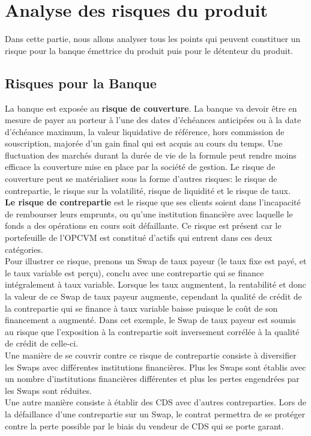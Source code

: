 \documentclass[french,12pt,a4paper]{article}
\begin{document}
\newpage
\section{Analyse des risques du produit}

Dans cette partie, nous allons analyser tous les points qui peuvent constituer un risque pour la banque émettrice du produit puis pour le détenteur du produit. \\


\subsection{Risques pour la Banque}


\indent La banque est exposée au \textbf{risque de couverture}. La banque va devoir être en mesure de payer au porteur à l'une des dates d'échéances anticipées ou à la date d'échéance maximum, la valeur liquidative de référence, hors commission de souscription, majorée d'un gain final qui est acquis au cours du temps. Une fluctuation des marchés durant la durée de vie de la formule peut rendre moins efficace la couverture mise en place par la société de gestion. Le risque de couverture peut se matérialiser sous la forme d'autres risques: le risque de contrepartie, le risque sur la volatilité, risque de liquidité et le risque de taux. \\

\indent \textbf{Le risque de contrepartie} est le risque que ses clients soient dans l'incapacité de rembourser leurs emprunts, ou qu'une institution financière avec laquelle le fonds a des opérations en cours soit défaillante. Ce risque est présent car le portefeuille de l'OPCVM est constitué d'actifs qui entrent dans ces deux catégories.\\
\indent Pour illustrer ce risque, prenons un Swap de taux payeur (le taux fixe est payé, et le taux variable est perçu), conclu avec une contrepartie qui se finance intégralement à taux variable. Lorsque les taux augmentent, la rentabilité et donc la valeur de ce Swap de taux payeur augmente, cependant la qualité de crédit de la contrepartie qui se finance à taux variable baisse puisque le coût de son financement a augmenté. Dans cet exemple, le Swap de taux payeur est soumis au risque que l'exposition à la contrepartie soit inversement corrélée à la qualité de crédit de celle-ci. \\
\indent Une manière de se couvrir contre ce risque de contrepartie consiste à diversifier les Swaps avec différentes institutions financières. Plus les Swaps sont établis avec un nombre d'institutions financières différentes et plus les pertes engendrées par les Swaps sont réduites.\\
Une autre manière consiste à établir des CDS avec d'autres contreparties. Lors de la défaillance d'une contrepartie sur un Swap, le contrat permettra de se protéger contre la perte possible par le biais du vendeur de CDS qui se porte garant.  \\
\end{document}
